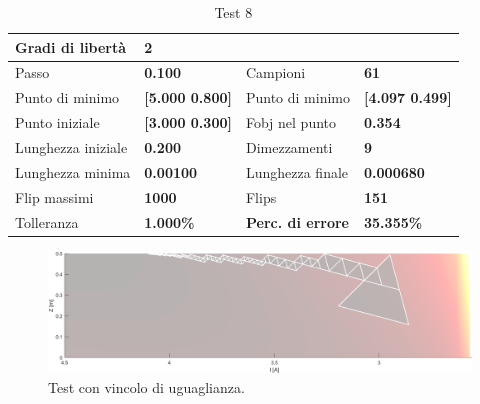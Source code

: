 \documentclass[a4paper, 11pt]{article}
\begin{document}
\begin{table}[h]
	\caption{Test 8}
	\begin{center}
	\begin{tabular}{|l|l|l|l|} 
	\hline 
	Gradi di libertà & \textbf{2} &  &  \\ \hline 
	Passo & \textbf{0.100} & Campioni & \textbf{61} \\ \hline 
	Punto di minimo & \textbf{{[}5.000 0.800{]}} & Punto di minimo & \textbf{{[}4.097 0.499{]}} \\ \hline 
	Punto iniziale & \textbf{{[}3.000 0.300{]}} & Fobj nel punto & \textbf{0.354} \\ \hline 
	Lunghezza iniziale & \textbf{0.200} & Dimezzamenti & \textbf{9} \\ \hline 
	Lunghezza minima & \textbf{0.00100} & Lunghezza finale & \textbf{0.000680} \\ \hline
	Flip massimi & \textbf{1000} & Flips & \textbf{151} \\ \hline 
	Tolleranza & \textbf{1.000\%} & \textbf{Perc. di errore} & \textbf{35.355\%} \\ \hline 
	\end{tabular} 
	\end{center}
	\end{table}

\begin{figure}[H]
	\centering
		\includegraphics[width=15cm]{assets/figure11}
		\caption{Test con vincolo di uguaglianza.}
\end{figure}
\end{document}
